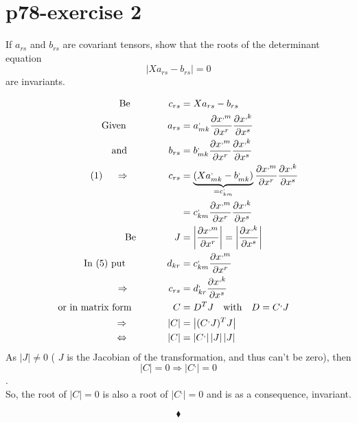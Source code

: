 \section{p78-exercise 2}
\begin{tcolorbox}
If $a_{rs}$ and $b_{rs}$ are covariant tensors, show that the roots of the determinant equation $$\left|Xa_{rs} - b_{rs}\right |= 0$$ are invariants.
\end{tcolorbox}
\begin{align}
\text{Be}\quad\quad\quad\quad c_{rs} &= Xa_{rs} - b_{rs}\\
\text{Given }\quad\quad\quad\quad a_{rs} &= a^{,}_{mk}\pdv{x^{,m}}{x^r} \pdv{x^{,k}}{x^s}\\
\text{and }\quad\quad\quad\quad b_{rs} &= b^{,}_{mk}\pdv{x^{,m}}{x^r} \pdv{x^{,k}}{x^s}\\
\text{(1) }\quad\Rightarrow\quad\quad\quad\quad c_{rs} &= \underbrace{(Xa^{,}_{mk}-b^{,}_{mk})}_{=c^{,}_{km}} \pdv{x^{,m}}{x^r} \pdv{x^{,k}}{x^s}\\
\ &= c^{,}_{km} \pdv{x^{,m}}{x^r} \pdv{x^{,k}}{x^s}\\
\text{Be}\quad\quad\quad\quad J &= \left |\pdv{x^{,m}}{x^r}\right |= \left |\pdv{x^{,k}}{x^s}\right |\\
\text{In (5) put  }\quad\quad\quad\quad d_{kr} &= c^{,}_{km} \pdv{x^{,m}}{x^r} \\
\Rightarrow\quad\quad\quad\quad c_{rs} &= d^{,}_{kr} \pdv{x^{,k}}{x^s}\\
\text{or in matrix form  } \quad\quad\quad\quad C &= D^T J\quad \text{with}\quad D = C^{,}J\\
\Rightarrow\quad\quad\quad\quad \left |C \right| &= \left | (C^{,}J)^T J\right |\\
\Leftrightarrow\quad\quad\quad\quad \left |C \right| &= \left | C^{,}\right | \left |J\right |\left |J\right |
\end{align}
As $ \left |J\right | \ne 0$ ( $J$ is the Jacobian of the transformation, and thus can't be zero), then $$\left |C \right| = 0 \Rightarrow \left |C^{,} \right| = 0$$.\\
So, the root of $\left |C \right| = 0 $ is also a root of $\left |C^{,} \right| = 0$ and is as a consequence, invariant.

$$\blacklozenge$$
\newpage


